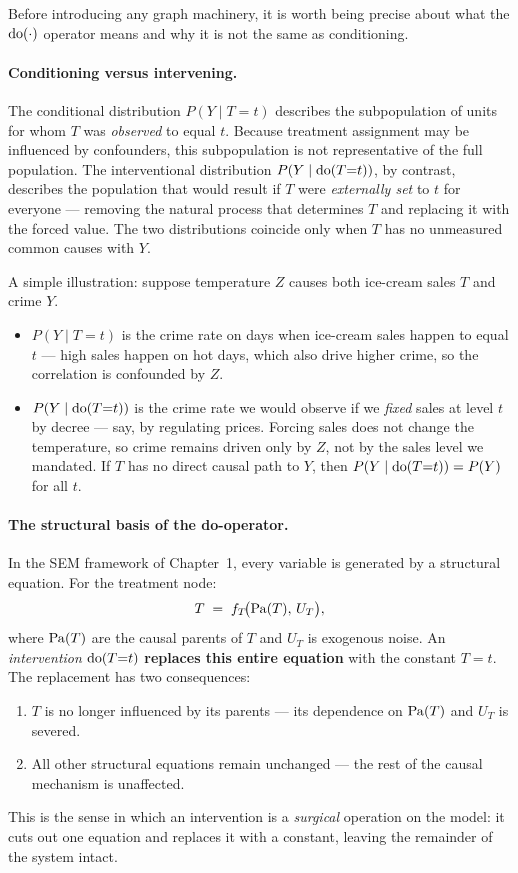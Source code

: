 \documentclass[master.tex]{subfiles}
\begin{document}
Before introducing any graph machinery, it is worth being precise about what
the $\mathrm{do}(\cdot)$ operator means and why it is not the same as conditioning.

\paragraph{Conditioning versus intervening.}
The conditional distribution $P(Y \mid T{=}t)$ describes the subpopulation of
units for whom $T$ was \emph{observed} to equal $t$.  Because treatment
assignment may be influenced by confounders, this subpopulation is not
representative of the full population.  The interventional distribution
$P(Y \mid \mathrm{do}(T{=}t))$, by contrast, describes the population that would
result if $T$ were \emph{externally set} to $t$ for everyone --- removing
the natural process that determines $T$ and replacing it with the forced
value.  The two distributions coincide only when $T$ has no unmeasured
common causes with $Y$.

A simple illustration: suppose temperature $Z$ causes both ice-cream sales
$T$ and crime $Y$.
\begin{itemize}
  \item $P(Y \mid T{=}t)$ is the crime rate on days when ice-cream sales
        happen to equal $t$ --- high sales happen on hot days, which also
        drive higher crime, so the correlation is confounded by $Z$.
  \item $P(Y \mid \mathrm{do}(T{=}t))$ is the crime rate we would observe if we
        \emph{fixed} sales at level $t$ by decree --- say, by regulating
        prices.  Forcing sales does not change the temperature, so crime
        remains driven only by $Z$, not by the sales level we mandated.
        If $T$ has no direct causal path to $Y$, then
        $P(Y \mid \mathrm{do}(T{=}t)) = P(Y)$ for all $t$.
\end{itemize}

\paragraph{The structural basis of the do-operator.}
In the SEM framework of Chapter~1, every variable is generated by a
structural equation.  For the treatment node:
\[
  T \;=\; f_T\!\bigl(\mathrm{Pa}(T),\, U_T\bigr),
\]
where $\mathrm{Pa}(T)$ are the causal parents of $T$ and $U_T$ is exogenous noise.
An \emph{intervention} $\mathrm{do}(T{=}t)$ \textbf{replaces this entire equation}
with the constant $T = t$.  The replacement has two consequences:
\begin{enumerate}
  \item $T$ is no longer influenced by its parents --- its dependence on
        $\mathrm{Pa}(T)$ and $U_T$ is severed.
  \item All other structural equations remain unchanged --- the rest of the
        causal mechanism is unaffected.
\end{enumerate}
This is the sense in which an intervention is a \emph{surgical} operation on
the model: it cuts out one equation and replaces it with a constant, leaving
the remainder of the system intact.
\end{document}
